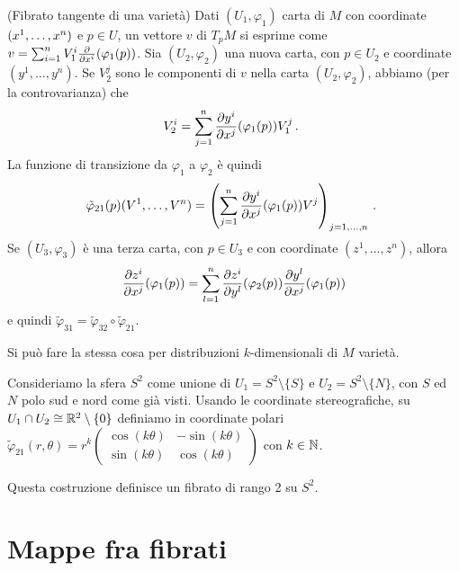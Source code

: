 \begin{example} %
	(Fibrato tangente di una varietà) Dati $(U_1,\varphi_1)$ carta di $M$ con coordinate $(\seqa xn,)$ e $p\in U$, un vettore $v$ di $T_pM$ si esprime come $v = \sum_{i=1}^n V^i_1\DerParz{}{x^i}(\varphi_1(p))$. Sia $(U_2, \varphi_2)$ una nuova carta, con $p\in U_2$ e coordinate $(y^1,\dots, y^n)$.
	 Se $V^j_2$ sono le componenti di $v$ nella carta $(U_2,\varphi_2)$, abbiamo (per la controvarianza) che
	 \begin{equation*}
	 	V^i_2 = \sum_{j=1}^n \DerParz{y^i}{x^j}(\varphi_1(p))V^j_1\punto
	 \end{equation*}
	 La funzione di transizione da $\varphi_1$ a $\varphi_2$ è quindi
	 \begin{equation*}
	 \tilde\varphi_{21}(p)(V^1,\dots,V^n) = \left(\sum_{j=1}^n \DerParz{y^i}{x^j}(\varphi_1(p))V^j\right)_{j=1,\dots,n}\punto
	 \end{equation*}
	 Se $(U_3, \varphi_3)$ è una terza carta, con $p\in U_3$ e con coordinate $(z^1,\dots,z^n)$, allora
	 \begin{equation*}
	 	\DerParz{z^i}{x^j}(\varphi_1(p)) = \sum_{l=1}^n \DerParz{z^i}{y^l}(\varphi_2(p)) \DerParz{y^l}{x^j}(\varphi_1(p))  
	 \end{equation*}
	e quindi $\tilde\varphi_{31}=\tilde\varphi_{32}\circ \tilde\varphi_{21}$.
	
	Si può fare la stessa cosa per distribuzioni $k$-dimensionali di $M$ varietà.
	
\end{example}

\begin{example}
	Consideriamo la sfera $S^2$ come unione di $U_1 = S^2\setminus \{S\}$ e $U_2 = S^2\setminus \{N\}$, con $S$ ed $N$ polo sud e nord come già visti. Usando le coordinate stereografiche, su $U_1\cap U_2\cong \R^2\setminus\{0\}$ definiamo in coordinate polari $\tilde\varphi_{21}(r,\theta) = r^k \left(\begin{matrix} \cos(k\theta)& -\sin(k\theta)\\ \sin(k\theta)& \cos(k\theta) \end{matrix}\right)$ con $k\in\N$.
	
	Questa costruzione definisce un fibrato di rango 2 su $S^2$.
\end{example}


\section{Mappe fra fibrati}

